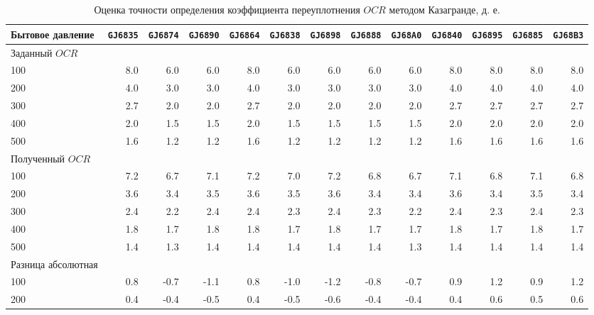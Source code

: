 \begin{sidewaystable}[p]
    \centering
    \small
    \caption{Оценка точности определения коэффициента переуплотнения $OCR$ методом Казагранде, д. е.} \label{tab:ocr-caz}
    \begin{tabular}{@{}lrrrrrrrrrrrr@{}}
    \toprule
    Бытовое давление & \texttt{GJ6835} & \texttt{GJ6874} & \texttt{GJ6890} & \texttt{GJ6864} & \texttt{GJ6838} & \texttt{GJ6898} & \texttt{GJ6888} & \texttt{GJ68A0} & \texttt{GJ6840} & \texttt{GJ6895} & \texttt{GJ6885} & \texttt{GJ68B3} \\
    \midrule
    Заданный $OCR$ &  &  &  &  &  &  &  &  &  &  &  &  \\
    100 & 8.0 & 6.0 & 6.0 & 8.0 & 6.0 & 6.0 & 6.0 & 6.0 & 8.0 & 8.0 & 8.0 & 8.0 \\
    200 & 4.0 & 3.0 & 3.0 & 4.0 & 3.0 & 3.0 & 3.0 & 3.0 & 4.0 & 4.0 & 4.0 & 4.0 \\
    300 & 2.7 & 2.0 & 2.0 & 2.7 & 2.0 & 2.0 & 2.0 & 2.0 & 2.7 & 2.7 & 2.7 & 2.7 \\
    400 & 2.0 & 1.5 & 1.5 & 2.0 & 1.5 & 1.5 & 1.5 & 1.5 & 2.0 & 2.0 & 2.0 & 2.0 \\
    500 & 1.6 & 1.2 & 1.2 & 1.6 & 1.2 & 1.2 & 1.2 & 1.2 & 1.6 & 1.6 & 1.6 & 1.6 \\
    \midrule
    Полученный $OCR$ &  &  &  &  &  &  &  &  &  &  &  &  \\
    100 & 7.2 & 6.7 & 7.1 & 7.2 & 7.0 & 7.2 & 6.8 & 6.7 & 7.1 & 6.8 & 7.1 & 6.8 \\
    200 & 3.6 & 3.4 & 3.5 & 3.6 & 3.5 & 3.6 & 3.4 & 3.4 & 3.6 & 3.4 & 3.5 & 3.4 \\
    300 & 2.4 & 2.2 & 2.4 & 2.4 & 2.3 & 2.4 & 2.3 & 2.2 & 2.4 & 2.3 & 2.4 & 2.3 \\
    400 & 1.8 & 1.7 & 1.8 & 1.8 & 1.7 & 1.8 & 1.7 & 1.7 & 1.8 & 1.7 & 1.8 & 1.7 \\
    500 & 1.4 & 1.3 & 1.4 & 1.4 & 1.4 & 1.4 & 1.4 & 1.3 & 1.4 & 1.4 & 1.4 & 1.4 \\
    \midrule
    Разница абсолютная &  &  &  &  &  &  &  &  &  &  &  &  \\
    100 & 0.8 & -0.7 & -1.1 & 0.8 & -1.0 & -1.2 & -0.8 & -0.7 & 0.9 & 1.2 & 0.9 & 1.2 \\
    200 & 0.4 & -0.4 & -0.5 & 0.4 & -0.5 & -0.6 & -0.4 & -0.4 & 0.4 & 0.6 & 0.5 & 0.6 \\

\end{tabular}
\end{sidewaystable}
